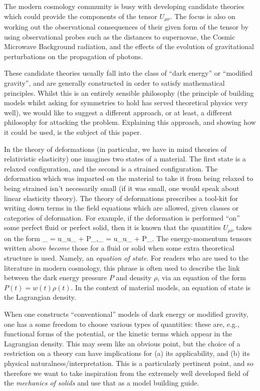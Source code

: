 The modern cosmology community is busy with developing candidate theories which could provide the components of the tensor $U_{\mu\nu}$. The focus is also on working out the observational consequences of their given form of the tensor by using observational probes such as the distances to supernovae, the Cosmic Microwave Background radiation, and the effects of the evolution of gravitational perturbations on the propagation of photons.  

These candidate theories usually fall into the class of ``dark energy'' or ``modified gravity'', and are generally constructed in order to satisfy mathematical principles. Whilst this is an entirely sensible philosophy (the principle of building models whilst asking for symmetries to hold has served theoretical physics very well), we  would like to suggest a different approach, or at least, a different philosophy for attacking the problem. Explaining this approach, and showing how it could be used, is the subject of this paper.


In the theory of deformations (in particular, we have in mind   theories of relativistic elasticity) one imagines two states of a material. The first state is a relaxed configuration, and the second is a strained configuration. The deformation which was imparted on the material to take it from being relaxed to being strained isn't necessarily small (if it was small, one would  speak about linear elasticity theory). The theory of deformations prescribes a tool-kit for writing down terms in the field equations which are allowed, given classes or categories of deformation. For example, if the deformation is performed ``on'' some perfect fluid or perfect solid, then it is known that the quantities $U_{\mu\nu}$ takes on the form
\bea
{}_{\mu\nu} = \rho u_{\mu}u_{\nu} + P\gamma_{\mu\nu},\qquad {}_{\mu\nu} = \rho u_{\mu}u_{\nu} + P_{\mu\nu}.
\eea
The energy-momentum tensors written above \textit{become} those for a fluid or solid when some extra theoretical structure is used. Namely, an \textit{equation of state}. For readers who are used to the literature in modern cosmology, this phrase is often used to describe the link between the dark energy pressure $P$ and density $\rho$, via an equation of the form $P(t) = w(t) \rho(t)$. In the context of material models, an equation of state is the Lagrangian density.

When one constructs ``conventional'' models of dark energy or modified gravity, one has a some freedom to choose various types of quantities: these are, e.g., functional forms of the potential, or the kinetic terms which appear in the Lagrangian density. This may seem like an obvious point, but the choice of a restriction on a theory can have implications for (a) its applicability, and (b) its physical naturalness/interpretation. This is a particularly pertinent point, and so therefore we want to take inspiration from the extremely well developed field of the \textit{mechanics of solids} and use that as a model building guide.


